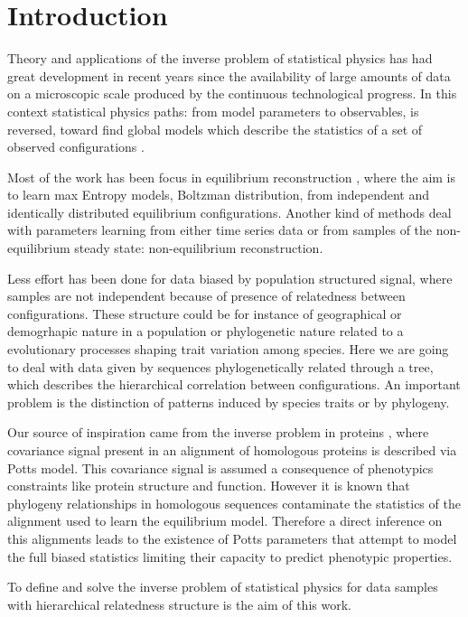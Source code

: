 \documentclass[preprint,amsmath,amssymb,superscriptaddress,showpacs,pre]{revtex4-1}
\begin{document}
\section{Introduction}
\label{sec:int}
Theory and applications of the inverse problem of statistical physics has had great development in recent years since the availability of large amounts of data on a microscopic scale produced by the continuous technological progress. In this context statistical physics paths: from model parameters to  observables, is reversed, toward find global models which describe the statistics of  a set of observed  configurations \cite{Inverse_problem_Berg}. 

Most of the work has been focus in equilibrium reconstruction , where the aim is to learn max Entropy models, Boltzman distribution, from independent and identically distributed equilibrium configurations. Another kind of methods deal with parameters learning from either time series data or from samples of the non-equilibrium steady state: non-equilibrium reconstruction.

Less effort has been done for data biased by population structured signal, where  samples  are not independent because of presence of relatedness between configurations. These structure could be for instance of  geographical or demogrhapic  nature in a population or  phylogenetic  nature  related to a evolutionary processes shaping trait variation among species.  Here we are going to deal with data given by sequences phylogenetically related  through a tree, which describes the hierarchical correlation between configurations. An important problem is the  distinction   of patterns induced by species traits or by phylogeny. 

Our source of inspiration came from the inverse problem in proteins \cite{Inverse_problem_proteins}, where  covariance signal present in an alignment of homologous proteins is described via Potts model. This covariance signal is assumed a consequence of phenotypics constraints like protein structure and function. However it is known that phylogeny relationships in homologous sequences  contaminate the statistics of  the alignment used to learn the equilibrium model. Therefore a direct inference on this alignments  leads to the existence of Potts parameters that attempt to model the full biased statistics limiting their capacity to predict phenotypic properties.

 To define and solve the inverse problem of statistical physics for data samples with hierarchical  relatedness structure is the aim of this work. 
\end{document}
